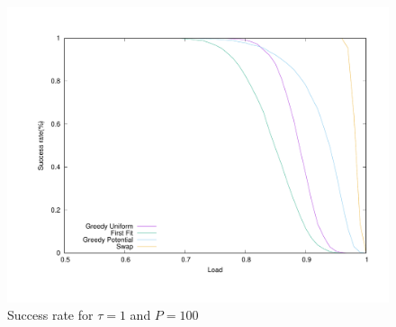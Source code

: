 \documentclass[10pt, conference, letterpaper]{algotel}
\begin{document}
\begin{figure}
\begin{center}
\includegraphics[scale=0.2]{success_tau1}
\end{center}
\caption{Success rate for $\tau = 1$ and $P=100$}
\label{fig:tau1}
\end{figure}







 
\end{document}
